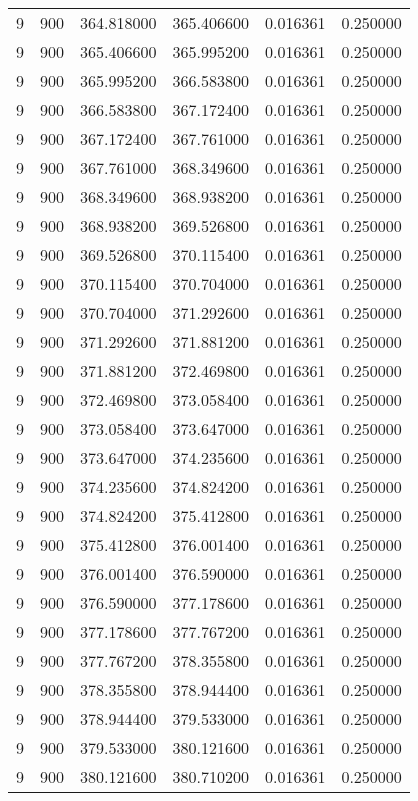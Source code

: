 \begin{longtable}{rrrrrr}
9 & 900 & 364.818000 & 365.406600 & 0.016361 & 0.250000 \\
9 & 900 & 365.406600 & 365.995200 & 0.016361 & 0.250000 \\
9 & 900 & 365.995200 & 366.583800 & 0.016361 & 0.250000 \\
9 & 900 & 366.583800 & 367.172400 & 0.016361 & 0.250000 \\
9 & 900 & 367.172400 & 367.761000 & 0.016361 & 0.250000 \\
9 & 900 & 367.761000 & 368.349600 & 0.016361 & 0.250000 \\
9 & 900 & 368.349600 & 368.938200 & 0.016361 & 0.250000 \\
9 & 900 & 368.938200 & 369.526800 & 0.016361 & 0.250000 \\
9 & 900 & 369.526800 & 370.115400 & 0.016361 & 0.250000 \\
9 & 900 & 370.115400 & 370.704000 & 0.016361 & 0.250000 \\
9 & 900 & 370.704000 & 371.292600 & 0.016361 & 0.250000 \\
9 & 900 & 371.292600 & 371.881200 & 0.016361 & 0.250000 \\
9 & 900 & 371.881200 & 372.469800 & 0.016361 & 0.250000 \\
9 & 900 & 372.469800 & 373.058400 & 0.016361 & 0.250000 \\
9 & 900 & 373.058400 & 373.647000 & 0.016361 & 0.250000 \\
9 & 900 & 373.647000 & 374.235600 & 0.016361 & 0.250000 \\
9 & 900 & 374.235600 & 374.824200 & 0.016361 & 0.250000 \\
9 & 900 & 374.824200 & 375.412800 & 0.016361 & 0.250000 \\
9 & 900 & 375.412800 & 376.001400 & 0.016361 & 0.250000 \\
9 & 900 & 376.001400 & 376.590000 & 0.016361 & 0.250000 \\
9 & 900 & 376.590000 & 377.178600 & 0.016361 & 0.250000 \\
9 & 900 & 377.178600 & 377.767200 & 0.016361 & 0.250000 \\
9 & 900 & 377.767200 & 378.355800 & 0.016361 & 0.250000 \\
9 & 900 & 378.355800 & 378.944400 & 0.016361 & 0.250000 \\
9 & 900 & 378.944400 & 379.533000 & 0.016361 & 0.250000 \\
9 & 900 & 379.533000 & 380.121600 & 0.016361 & 0.250000 \\
9 & 900 & 380.121600 & 380.710200 & 0.016361 & 0.250000 \\

\end{longtable}
